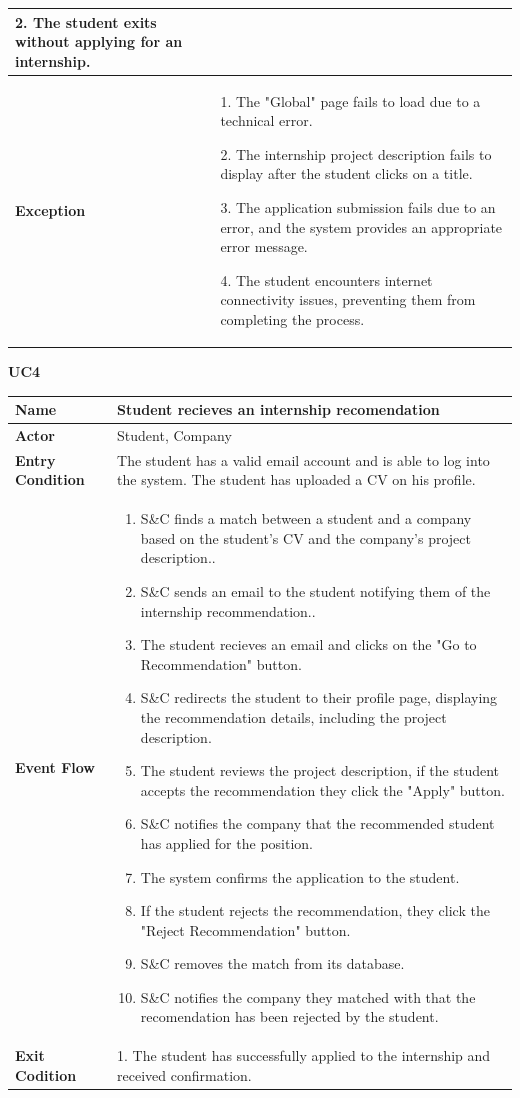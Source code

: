 \begin{longtable}{|p{}|p{}|}
2. The student exits without applying for an internship.\\
\hline
\textbf{Exception} &  
1. The "Global" page fails to load due to a technical error.	

2. The internship project description fails to display after the student clicks on a title.

3. The application submission fails due to an error, and the system provides an appropriate error message.	

4. The student encounters internet connectivity issues, preventing them from completing the process.\\
\hline
\end{longtable}


\textbf{UC4}

\begin{longtable}{|p{}|p{}|}
\hline
\textbf{Name} &  Student recieves an internship recomendation\\
\hline
\textbf{Actor} &  Student, Company\\
\hline
\textbf{Entry Condition} &  The student has a valid email account and is able to log into the system. The student has uploaded a CV on his profile.\\
\hline
\textbf{Event Flow} &  
\begin{enumerate}
\item S\&C finds a match between a student and a company based on the student's CV and the company’s project description..
\item S\&C sends an email to the student notifying them of the internship recommendation..
\item The student recieves an email and clicks on the "Go to Recommendation" button.
\item S\&C redirects the student to their profile page, displaying the recommendation details, including the project description.
\item The student reviews the project description, if the student accepts the recommendation they click the "Apply" button.
\item S\&C notifies the company that the recommended student has applied for the position.
\item The system confirms the application to the student.
\item If the student rejects the recommendation, they click the "Reject Recommendation" button.
\item S\&C removes the match from its database.
\item S\&C notifies the company they matched with that the recomendation has been rejected by the student. 
\end{enumerate}
\\
\hline
\textbf{Exit Codition} & 
1. The student has successfully applied to the internship and received confirmation.


\end{longtable}

